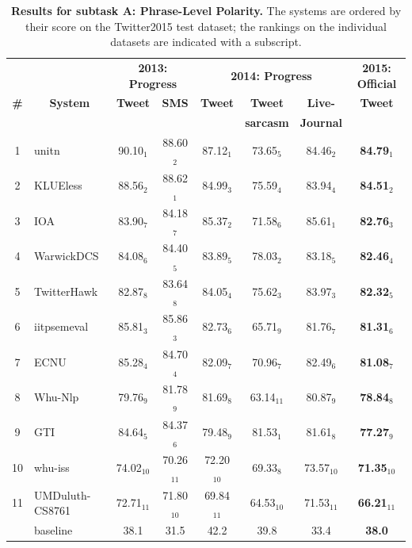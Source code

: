 \documentclass[11pt]{article}
\begin{document}
\begin{table}[t!]
    \centering
    \begin{small}
    \begin{tabular}{c|l|cc|ccc|c}
    \hline
   & & \multicolumn{2}{c|}{\bf 2013: Progress} & \multicolumn{3}{c|}{\bf 2014: Progress} & \bf 2015: Official \\
   \bf \# & \multicolumn{1}{|c|}{\bf System} & \bf Tweet & \bf SMS & \bf Tweet & \bf Tweet & \bf Live- & \bf Tweet \\
   & &  &  & \bf & \bf sarcasm & \bf Journal & \\
    \hline
	1 & unitn & 90.10$_{1}$ & 88.60$_{2}$ & 87.12$_{1}$ & 73.65$_{5}$ & 84.46$_{2}$ & \bf 84.79$_{1}$\\
	2 & KLUEless & 88.56$_{2}$ & 88.62$_{1}$ & 84.99$_{3}$ & 75.59$_{4}$ & 83.94$_{4}$ & \bf 84.51$_{2}$\\
	3 & IOA & 83.90$_{7}$ & 84.18$_{7}$ & 85.37$_{2}$ & 71.58$_{6}$ & 85.61$_{1}$ & \bf 82.76$_{3}$\\
	4 & WarwickDCS & 84.08$_{6}$ & 84.40$_{5}$ & 83.89$_{5}$ & 78.03$_{2}$ & 83.18$_{5}$ & \bf 82.46$_{4}$\\
	5 & TwitterHawk & 82.87$_{8}$ & 83.64$_{8}$ & 84.05$_{4}$ & 75.62$_{3}$ & 83.97$_{3}$ & \bf 82.32$_{5}$\\
	6 & iitpsemeval & 85.81$_{3}$ & 85.86$_{3}$ & 82.73$_{6}$ & 65.71$_{9}$ & 81.76$_{7}$ & \bf 81.31$_{6}$\\
	7 & ECNU & 85.28$_{4}$ & 84.70$_{4}$ & 82.09$_{7}$ & 70.96$_{7}$ & 82.49$_{6}$ & \bf 81.08$_{7}$\\
	8 & Whu-Nlp & 79.76$_{9}$ & 81.78$_{9}$ & 81.69$_{8}$ & 63.14$_{11}$ & 80.87$_{9}$ & \bf 78.84$_{8}$\\
	9 & GTI & 84.64$_{5}$ & 84.37$_{6}$ & 79.48$_{9}$ & 81.53$_{1}$ & 81.61$_{8}$ & \bf 77.27$_{9}$\\
	10 & whu-iss & 74.02$_{10}$ & 70.26$_{11}$ & 72.20$_{10}$ & 69.33$_{8}$ & 73.57$_{10}$ & \bf 71.35$_{10}$\\
	11 & UMDuluth-CS8761 & 72.71$_{11}$ & 71.80$_{10}$ & 69.84$_{11}$ & 64.53$_{10}$ & 71.53$_{11}$ & \bf 66.21$_{11}$\\
	\hline
	& baseline & 38.1 & 31.5 & 42.2 & 39.8 & 33.4 & \bf 38.0\\
	\hline
    \end{tabular}
    \end{small}
    \caption{\label{tab:res-subtaskA} \textbf{Results for subtask A: Phrase-Level Polarity.}
             The systems are ordered by their score on the Twitter2015 test dataset;
             the rankings on the individual datasets are indicated with a subscript.}
  \end{table}
\end{document}
